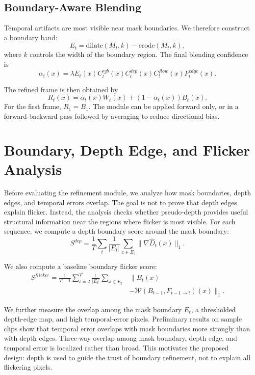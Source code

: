 \documentclass[nouppercase]{kaia}
\begin{document}
\subsection{Boundary-Aware Blending}
Temporal artifacts are most visible near mask boundaries. We therefore construct a boundary band:
\begin{equation}
    E_t = \text{dilate}(M_t, k) - \text{erode}(M_t, k),
\end{equation}
where $k$ controls the width of the boundary region. The final blending confidence is
\begin{equation}
    \alpha_t(x) = \lambda E_t(x) C^{rgb}_t(x) C^{dep}_t(x) C^{flow}_t(x) P^{edge}_t(x).
\end{equation}

The refined frame is then obtained by
\begin{equation}
    R_t(x) = \alpha_t(x) W_t(x) + (1-\alpha_t(x))B_t(x).
\end{equation}
For the first frame, $R_1=B_1$. The module can be applied forward only, or in a forward-backward pass followed by averaging to reduce directional bias.

\section{Boundary, Depth Edge, and Flicker Analysis}
Before evaluating the refinement module, we analyze how mask boundaries, depth edges, and temporal errors overlap. The goal is not to prove that depth edges explain flicker. Instead, the analysis checks whether pseudo-depth provides useful structural information near the regions where flicker is most visible. For each sequence, we compute a depth boundary score around the mask boundary:
\begin{equation}
    S^{dep} = \frac{1}{T}\sum_t \frac{1}{|E_t|}\sum_{x \in E_t} \lVert \nabla \hat{D}_t(x) \rVert_1.
\end{equation}

We also compute a baseline boundary flicker score:
\begin{equation}
    \begin{aligned}
    S^{flicker} = \frac{1}{T-1}\sum_{t=2}^{T} \frac{1}{|E_t|}
    \sum_{x \in E_t} &\lVert B_t(x) \\
    &- \mathcal{W}(B_{t-1}, F_{t-1 \rightarrow t})(x) \rVert_1.
    \end{aligned}
\end{equation}

We further measure the overlap among the mask boundary $E_t$, a thresholded depth-edge map, and high temporal-error pixels. Preliminary results on sample clips show that temporal error overlaps with mask boundaries more strongly than with depth edges. Three-way overlap among mask boundary, depth edge, and temporal error is localized rather than broad. This motivates the proposed design: depth is used to guide the trust of boundary refinement, not to explain all flickering pixels.
\end{document}
